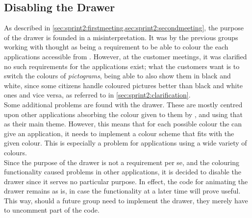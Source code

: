 \subsection{Disabling the Drawer}
As described in \cref{sec:sprint2:firstmeeting,sec:sprint2:secondmeeting}, the purpose of the drawer is founded in a misinterpretation.
It was by the previous groups working with \launcher thought as being a requirement to be able to colour the each \giraf applications accessible from \launcher.
However, at the customer meetings, it was clarified no such requirements for the applications exist;
what the customers want is to switch the colours of \textit{pictograms}, being able to also show them in black and white, since some citizens handle coloured pictures better than black and white ones and vice versa, as referred to in \cref{sec:sprint2:clarification}.\\

Some additional problems are found with the drawer.
These are mostly centred upon other applications absorbing the colour given to them by \launcher, and using that as their main theme.
However, this means that for each possible colour the \launcher can give an application, it needs to implement a colour scheme that fits with the given colour.
This is especially a problem for applications using a wide variety of colours.\\

Since the purpose of the drawer is not a requirement per se, and the colouring functionality caused problems in other applications, it is decided to disable the drawer since it serves no particular purpose.
In effect, the code for animating the drawer remains as is, in case the functionality at a later time will prove useful.
This way, should a future group need to implement the drawer, they merely have to uncomment part of the code.